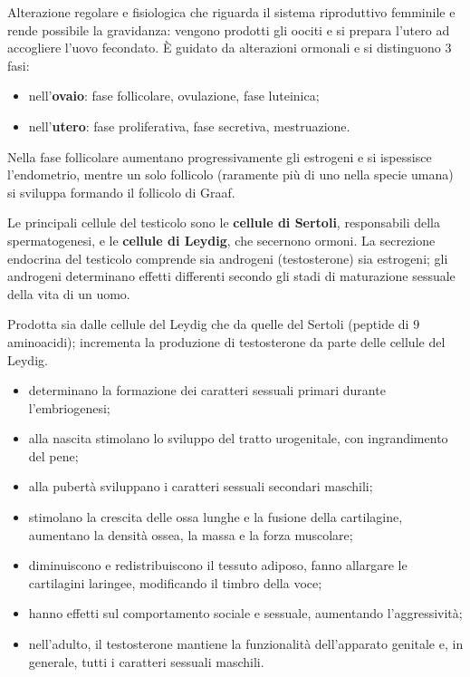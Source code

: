 Alterazione regolare e fisiologica che riguarda il sistema riproduttivo
femminile e rende possibile la gravidanza: vengono prodotti gli oociti e si
prepara l'utero ad accogliere l'uovo fecondato. È guidato da alterazioni
ormonali e si distinguono 3 fasi:
\begin{itemize}
  \item nell'\textbf{ovaio}: fase follicolare, ovulazione, fase luteinica;
  \item nell'\textbf{utero}: fase proliferativa, fase secretiva,
    mestruazione.
\end{itemize}
Nella fase follicolare aumentano progressivamente gli estrogeni e si
ispessisce l'endometrio, mentre un solo follicolo (raramente più di uno
nella specie umana) si sviluppa formando il follicolo di Graaf.

Le principali cellule del testicolo sono le \textbf{cellule di Sertoli},
responsabili della spermatogenesi, e le \textbf{cellule di Leydig}, che
secernono ormoni. La secrezione endocrina del testicolo comprende sia
androgeni (testosterone) sia estrogeni; gli androgeni determinano effetti
differenti secondo gli stadi di maturazione sessuale della vita di un uomo.

Prodotta sia dalle cellule del Leydig che da quelle del Sertoli (peptide di
9 aminoacidi); incrementa la produzione di testosterone da parte delle
cellule del Leydig.

\begin{itemize}
  \item determinano la formazione dei caratteri sessuali primari durante
    l'embriogenesi;
  \item alla nascita stimolano lo sviluppo del tratto urogenitale, con
    ingrandimento del pene;
  \item alla pubertà sviluppano i caratteri sessuali secondari maschili;
  \item stimolano la crescita delle ossa lunghe e la fusione della
    cartilagine, aumentano la densità ossea, la massa e la forza
    muscolare;
  \item diminuiscono e redistribuiscono il tessuto adiposo, fanno allargare
    le cartilagini laringee, modificando il timbro della voce;
  \item hanno effetti sul comportamento sociale e sessuale, aumentando
    l'aggressività;
  \item nell'adulto, il testosterone mantiene la funzionalità dell'apparato
    genitale e, in generale, tutti i caratteri sessuali maschili.
\end{itemize}

